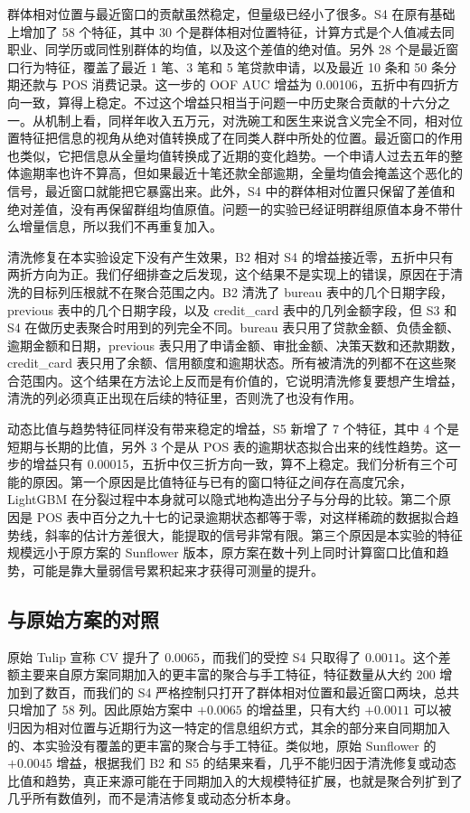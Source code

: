 \documentclass[12pt,UTF8,fontset=windows]{ctexart}
\begin{document}
群体相对位置与最近窗口的贡献虽然稳定，但量级已经小了很多。S4 在原有基础上增加了 58 个特征，其中 30 个是群体相对位置特征，计算方式是个人值减去同职业、同学历或同性别群体的均值，以及这个差值的绝对值。另外 28 个是最近窗口行为特征，覆盖了最近 1 笔、3 笔和 5 笔贷款申请，以及最近 10 条和 50 条分期还款与 POS 消费记录。这一步的 OOF AUC 增益为 0.00106，五折中有四折方向一致，算得上稳定。不过这个增益只相当于问题一中历史聚合贡献的十六分之一。从机制上看，同样年收入五万元，对洗碗工和医生来说含义完全不同，相对位置特征把信息的视角从绝对值转换成了在同类人群中所处的位置。最近窗口的作用也类似，它把信息从全量均值转换成了近期的变化趋势。一个申请人过去五年的整体逾期率也许不算高，但如果最近十笔还款全部逾期，全量均值会掩盖这个恶化的信号，最近窗口就能把它暴露出来。此外，S4 中的群体相对位置只保留了差值和绝对差值，没有再保留群组均值原值。问题一的实验已经证明群组原值本身不带什么增量信息，所以我们不再重复加入。

清洗修复在本实验设定下没有产生效果，B2 相对 S4 的增益接近零，五折中只有两折方向为正。我们仔细排查之后发现，这个结果不是实现上的错误，原因在于清洗的目标列压根就不在聚合范围之内。B2 清洗了 bureau 表中的几个日期字段，previous 表中的几个日期字段，以及 credit\_card 表中的几列金额字段，但 S3 和 S4 在做历史表聚合时用到的列完全不同。bureau 表只用了贷款金额、负债金额、逾期金额和日期，previous 表只用了申请金额、审批金额、决策天数和还款期数，credit\_card 表只用了余额、信用额度和逾期状态。所有被清洗的列都不在这些聚合范围内。这个结果在方法论上反而是有价值的，它说明清洗修复要想产生增益，清洗的列必须真正出现在后续的特征里，否则洗了也没有作用。

动态比值与趋势特征同样没有带来稳定的增益，S5 新增了 7 个特征，其中 4 个是短期与长期的比值，另外 3 个是从 POS 表的逾期状态拟合出来的线性趋势。这一步的增益只有 0.00015，五折中仅三折方向一致，算不上稳定。我们分析有三个可能的原因。第一个原因是比值特征与已有的窗口特征之间存在高度冗余，LightGBM 在分裂过程中本身就可以隐式地构造出分子与分母的比较。第二个原因是 POS 表中百分之九十七的记录逾期状态都等于零，对这样稀疏的数据拟合趋势线，斜率的估计方差很大，能提取的信号非常有限。第三个原因是本实验的特征规模远小于原方案的 Sunflower 版本，原方案在数十列上同时计算窗口比值和趋势，可能是靠大量弱信号累积起来才获得可测量的提升。

\subsection{与原始方案的对照}

原始 Tulip 宣称 CV 提升了 $0.0065$，而我们的受控 S4 只取得了 $0.0011$。这个差额主要来自原方案同期加入的更丰富的聚合与手工特征，特征数量从大约 200 增加到了数百，而我们的 S4 严格控制只打开了群体相对位置和最近窗口两块，总共只增加了 58 列。因此原始方案中 $+0.0065$ 的增益里，只有大约 $+0.0011$ 可以被归因为相对位置与近期行为这一特定的信息组织方式，其余的部分来自同期加入的、本实验没有覆盖的更丰富的聚合与手工特征。类似地，原始 Sunflower 的 $+0.0045$ 增益，根据我们 B2 和 S5 的结果来看，几乎不能归因于清洗修复或动态比值和趋势，真正来源可能在于同期加入的大规模特征扩展，也就是聚合列扩到了几乎所有数值列，而不是清洁修复或动态分析本身。
\end{document}
